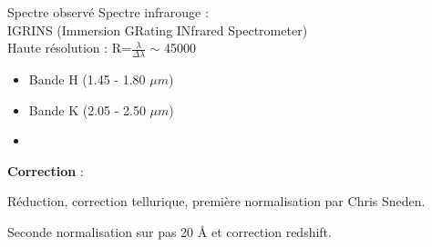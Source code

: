 \documentclass[10pt]{beamer}
\begin{document}
\begin{frame}[fragile]{Spectre observé}
             Spectre infrarouge : \\
             IGRINS (Immersion GRating INfrared Spectrometer) \\ 
             Haute résolution : R=$\frac{\lambda}{\Delta \lambda}$ $\sim$ 45000 \\
    					\begin{itemize}
    						\item Bande H (1.45 - 1.80 $\mu m$)
    						\item Bande K (2.05 - 2.50 $\mu m$)
    						\item[]
    					\end{itemize}
        \vfill
        \textbf{Correction} : 

        Réduction, correction tellurique, première normalisation par Chris Sneden. 
        
        Seconde normalisation sur pas 20 Å et correction redshift. \\
\end{frame}
\end{document}
